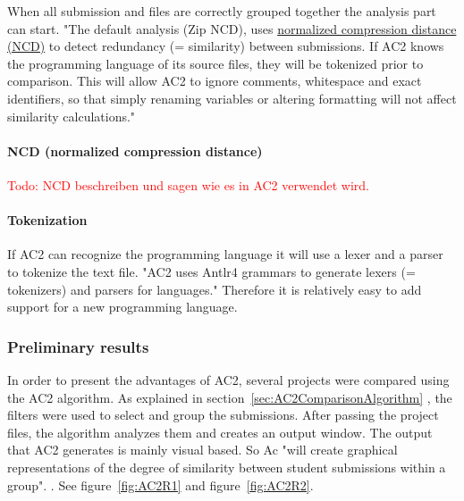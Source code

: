 \documentclass[a4paper, 11pt]{article}
\renewcommand{\\}{\vspace*{0.5\baselineskip} \newline}
\begin{document}
When all submission and files are correctly grouped together the analysis part can start. "The default analysis (Zip NCD), uses \hyperref[sec:NCD]{normalized compression distance (NCD)} to detect redundancy (= similarity) between submissions. If AC2 knows the programming language of its source files, they will be tokenized prior to comparison. This will allow AC2 to ignore comments, whitespace and exact identifiers, so that simply renaming variables or altering formatting will not affect similarity calculations." \autocite{AC2wiki} 

\paragraph{NCD (normalized compression distance)}
\label{sec:NCD}

\textcolor{red}{Todo: NCD beschreiben und sagen wie es in AC2 verwendet wird.}

\paragraph{Tokenization}

If AC2 can recognize the programming language it will use a lexer and a parser to tokenize the text file. "AC2 uses Antlr4 grammars to generate lexers (= tokenizers) and parsers for languages." \autocite{AC2wiki} Therefore it is relatively easy to add support for a new programming language.

\subsubsection{Preliminary results}

In order to present the advantages of AC2, several projects were compared using the AC2 algorithm. As explained in section~\ref{sec:AC2ComparisonAlgorithm} , the filters were used to select and group the submissions. After passing the project files, the algorithm analyzes them and creates an output window. The output that AC2 generates is mainly visual based. So Ac "will create graphical representations of the degree of similarity between student submissions within a group". \autocite{AC2}. See figure~\ref{fig:AC2R1} and figure~\ref{fig:AC2R2}.
\end{document}
